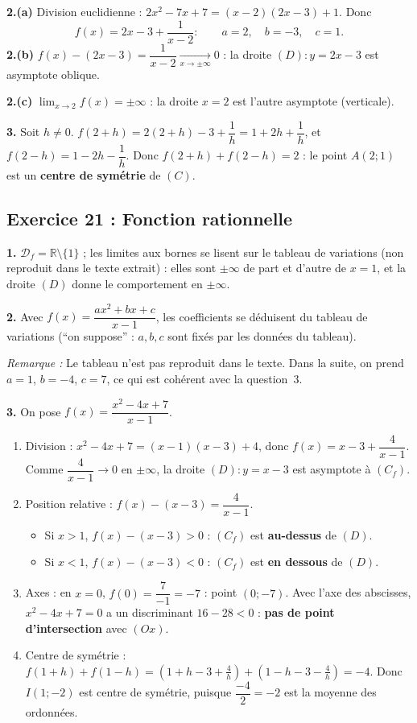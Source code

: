 \documentclass[11pt,a4paper]{article}
\newcommand{\R}{\mathbb{R}}
\newenvironment{rem}{\par\medskip\noindent\textit{Remarque :}\quad}{\par\medskip}
\begin{document}
\textbf{2.(a)} Division euclidienne : $2x^2-7x+7=(x-2)(2x-3)+1$. Donc
\[
f(x)=2x-3+\frac{1}{x-2} : \qquad a=2,\quad b=-3,\quad c=1.
\]
\textbf{2.(b)} $f(x)-(2x-3)=\dfrac{1}{x-2}\xrightarrow[x\to\pm\infty]{}0$ : la droite $(D):y=2x-3$ est asymptote oblique.

\textbf{2.(c)} $\lim_{x\to2}f(x)=\pm\infty$ : la droite $x=2$ est l'autre asymptote (verticale).

\textbf{3.} Soit $h\neq0$. $f(2+h)=2(2+h)-3+\dfrac1h=1+2h+\dfrac1h$, et
$f(2-h)=1-2h-\dfrac1h$. Donc $f(2+h)+f(2-h)=2$ : le point $A(2;1)$ est un \textbf{centre de sym\'etrie} de $(C)$.

\subsection{Exercice 21 : Fonction rationnelle}

\textbf{1.} $\mathcal D_f=\R\setminus\{1\}$ ; les limites aux bornes se lisent sur le tableau de variations
(non reproduit dans le texte extrait) : elles sont $\pm\infty$ de part et d'autre de $x=1$, et la droite
$(D)$ donne le comportement en $\pm\infty$.

\textbf{2.} Avec $f(x)=\dfrac{ax^2+bx+c}{x-1}$, les coefficients se d\'eduisent du tableau de variations
(``on suppose'' : $a,b,c$ sont fix\'es par les donn\'ees du tableau).
\begin{rem} Le tableau n'est pas reproduit dans le texte. Dans la suite, on prend $a=1$, $b=-4$, $c=7$,
ce qui est coh\'erent avec la question~3.\end{rem}

\textbf{3.} On pose $f(x)=\dfrac{x^2-4x+7}{x-1}$.
\begin{enumerate}[label=(\alph*)]
  \item Division : $x^2-4x+7=(x-1)(x-3)+4$, donc $f(x)=x-3+\dfrac{4}{x-1}$.
  Comme $\dfrac{4}{x-1}\to0$ en $\pm\infty$, la droite $(D):y=x-3$ est asymptote \`a $(C_f)$.
  \item Position relative : $f(x)-(x-3)=\dfrac{4}{x-1}$.
  \begin{itemize}
    \item Si $x>1$, $f(x)-(x-3)>0$ : $(C_f)$ est \textbf{au-dessus} de $(D)$.
    \item Si $x<1$, $f(x)-(x-3)<0$ : $(C_f)$ est \textbf{en dessous} de $(D)$.
  \end{itemize}
  \item Axes : en $x=0$, $f(0)=\dfrac{7}{-1}=-7$ : point $(0;-7)$. Avec l'axe des abscisses, $x^2-4x+7=0$ a un discriminant
  $16-28<0$ : \textbf{pas de point d'intersection} avec $(Ox)$.
  \item Centre de sym\'etrie : $f(1+h)+f(1-h)=(1+h-3+\tfrac4h)+(1-h-3-\tfrac4h)=-4$.
  Donc $I(1;-2)$ est centre de sym\'etrie, puisque $\dfrac{-4}{2}=-2$ est la moyenne des ordonn\'ees.
\end{enumerate}
\end{document}
